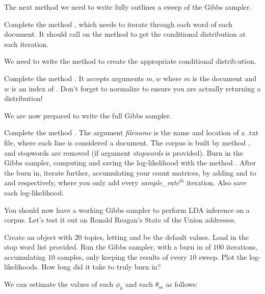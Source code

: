 The next method we need to write fully outlines a sweep of the Gibbs sampler.

\begin{problem}
Complete the method , which needs to iterate through each word of each document. It should call on the method  to get the conditional distribution at each iteration.
\end{problem}

We need to write the method to create the appropriate conditional distrib:ution.

\begin{problem}
Complete the method . It accepts arguments $m,w$ where $m$ is the document and $w$ is an index of . Don't forget to normalize to ensure you are actually returning a distribution!
\end{problem}

We are now prepared to write the full Gibbs sampler.

\begin{problem}
Complete the method . The argument \emph{filename} is the name and location of a .txt file, where each line is considered a document. The corpus is built by method , and stopwords are removed (if argument \emph{stopwords} is provided). Burn in the Gibbs sampler, computing and saving the log-likelihood with the method . After the burn in, iterate further, accumulating your count matrices, by adding  and  to  and  respectively, where you only add every \emph{sample\_rate}$^{th}$ iteration. Also save each log-likelihood.
\end{problem}

You should now have a working Gibbs sampler to perform LDA inference on a corpus. Let's test it out on Ronald Reagan's State of the Union addresses.

\begin{problem}
Create an  object with $20$ topics, letting  and  be the default values. Load in the stop word list provided. Run the Gibbs sampler, with a burn in of $100$ iterations, accumulating $10$ samples, only keeping the results of every $10$ sweep. Plot the log-likelihoods. How long did it take to truly burn in?
\end{problem}

We can estimate the values of each $\phi_{k}$ and each $\theta_{m}$ as follows:

